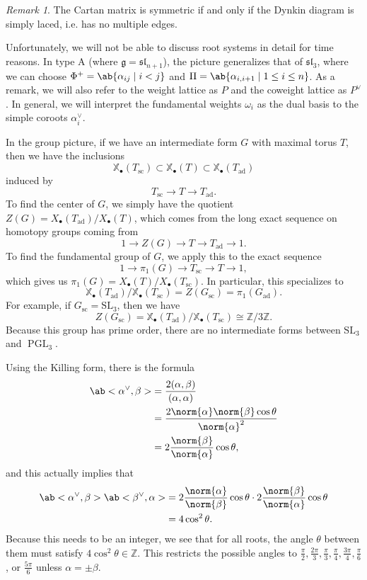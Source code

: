 \documentclass{amsart}
\theoremstyle{definition}
\theoremstyle{remark}
\newtheorem{rmk}[thm]{Remark}
\theoremstyle{plain}
\theoremstyle{definition}
\theoremstyle{remark}
\newcommand{\Z}{\mathbb{Z}}
\newcommand{\X}{\mathbb{X}}
\newcommand{\g}{\mathfrak{g}}
\newcommand{\mf}[1]{\mathfrak{#1}}
\newcommand{\mr}[1]{\mathrm{#1}}
\newcommand{\on}[1]{\operatorname{#1}}
\newcommand{\1}{\mathbf{1}}
\newcommand{\2}{\mathbf{2}}
\newcommand{\3}{\mathbf{3}}
\newcommand{\SL}{\mr{SL}}
\renewcommand{\sl}{\mf{sl}}
\DeclareMathOperator{\ad}{ad}
\begin{document}
\begin{rmk}
    The Cartan matrix is symmetric if and only if the Dynkin diagram is simply laced, i.e. has no multiple edges.
\end{rmk}

Unfortunately, we will not be able to discuss root systems in detail for time reasons. In type A (where \(\g = \sl_{n+1}\)), the picture generalizes that of \(\sl_3\), where we can choose \(\Phi^+ = \ab\{ \alpha_{ij} \mid i < j\}\) and \(\Pi = \ab\{\alpha_{i,i+1} \mid 1 \leq i \leq n\}\). As a remark, we will also refer to the weight lattice as \(P\) and the coweight lattice as \(P^{\vee}\). In general, we will interpret the fundamental weights \(\omega_i\) as the dual basis to the simple coroots \(\alpha_i^{\vee}\).

In the group picture, if we have an intermediate form \(G\) with maximal torus \(T\), then we have the inclusions
\[ \X_{\bullet}(T_{\on{sc}}) \subset \X_{\bullet}(T) \subset \X_{\bullet}(T_{\ad}) \]
induced by
\[ T_{\on{sc}} \to T \to T_{\ad}. \]
To find the center of \(G\), we simply have the quotient \(Z(G) = X_{\bullet}(T_{\ad}) / X_{\bullet}(T) \), which comes from the long exact sequence on homotopy groups coming from 
\[ 1 \to Z(G) \to T \to T_{\on{ad}} \to 1. \]
To find the fundamental group of \(G\), we apply this to the exact sequence
\[ 1 \to \pi_1(G) \to T_{\on{sc}} \to T \to 1, \]
which gives us \(\pi_1(G) = X_{\bullet}(T) / X_{\bullet}(T_{\on{sc}})\). In particular, this specializes to
\[ \X_{\bullet}(T_{\ad}) / \X_{\bullet}(T_{\on{sc}}) = Z(G_{\on{sc}}) = \pi_1(G_{\ad}). \]
For example, if \(G_{\on{sc}} = \SL_3\), then we have
\[ Z(G_{\on{sc}}) = \X_{\bullet}(T_{\ad}) / \X_{\bullet}(T_{\on{sc}}) \cong \Z / 3 \Z. \]
Because this group has prime order, there are no intermediate forms between \(\SL_3\) and \(\on{PGL}_3\).

Using the Killing form, there is the formula
\begin{align*}
    \ab<\alpha^{\vee}, \beta> &= \frac{2 (\alpha, \beta)}{(\alpha, \alpha)} \\
    &= \frac{2 \norm{\alpha} \norm{\beta} \cos\theta}{\norm{\alpha}^2} \\
    &= 2 \frac{\norm{\beta}}{\norm{\alpha}} \cos\theta,
\end{align*}
and this actually implies that
\begin{align*}
    \ab<\alpha^{\vee}, \beta> \ab<\beta^{\vee}, \alpha> &= 2 \frac{\norm{\alpha}}{\norm{\beta}} \cos\theta \cdot 2 \frac{\norm{\beta}}{\norm{\alpha}} \cos\theta \\
    &=  4 \cos^2 \theta.
\end{align*}
Because this needs to be an integer, we see that for all roots, the angle \(\theta\) between them must satisfy \(4 \cos^2 \theta \in \Z \). This restricts the possible angles to \(\frac{\pi}{2}, \frac{2\pi}{3}, \frac{\pi}{3}, \frac{\pi}{4}, \frac{3\pi}{4}, \frac{\pi}{6}\), or \(\frac{5\pi}{6}\) unless \(\alpha = \pm \beta\).
\end{document}
